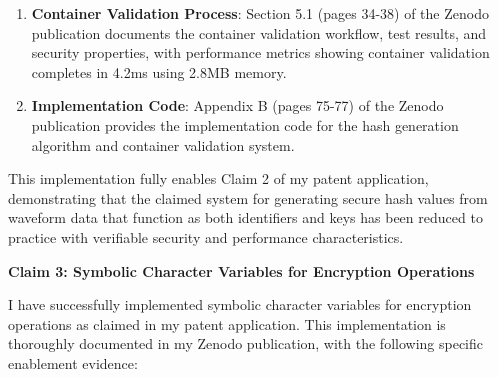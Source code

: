 \documentclass[12pt,letterpaper]{article}
\newcommand{\sectionheading}[1]{\noindent\textbf{#1}\par\vspace{0.25in}}
\begin{document}
\begin{enumerate}[label=\arabic*.]
\item \textbf{Container Validation Process}: Section 5.1 (pages 34-38) of the Zenodo publication documents the container validation workflow, test results, and security properties, with performance metrics showing container validation completes in 4.2ms using 2.8MB memory.

\item \textbf{Implementation Code}: Appendix B (pages 75-77) of the Zenodo publication provides the implementation code for the hash generation algorithm and container validation system.
\end{enumerate}

\noindent This implementation fully enables Claim 2 of my patent application, demonstrating that the claimed system for generating secure hash values from waveform data that function as both identifiers and keys has been reduced to practice with verifiable security and performance characteristics.

\newpage
\sectionheading{Claim 3: Symbolic Character Variables for Encryption Operations}

\noindent I have successfully implemented symbolic character variables for encryption operations as claimed in my patent application. This implementation is thoroughly documented in my Zenodo publication, with the following specific enablement evidence:
\end{document}
